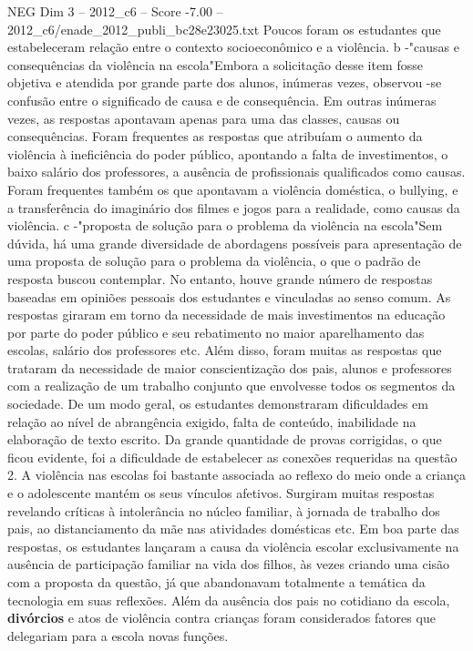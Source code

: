 \begin{textsample}{NEG Dim 3 – 2012\_c6 – Score -7.00 – 2012\_c6/enade\_2012\_publi\_bc28e23025.txt}
Poucos foram os estudantes que estabeleceram relação entre o contexto socioeconômico e a violência. b -"causas e consequências da violência na escola"Embora a solicitação desse item fosse objetiva e atendida por grande parte dos alunos, inúmeras vezes, observou -se confusão entre o significado de causa e de consequência.
Em outras inúmeras vezes, as respostas apontavam apenas para uma das classes, causas ou consequências.
Foram frequentes as respostas que atribuíam o aumento da violência à ineficiência do poder público, apontando a falta de investimentos, o baixo salário dos professores, a ausência de profissionais qualificados como causas.
Foram frequentes também os que apontavam a violência doméstica, o bullying, e a transferência do imaginário dos filmes e jogos para a realidade, como causas da violência. c -"proposta de solução para o problema da violência na escola"Sem dúvida, há uma grande diversidade de abordagens possíveis para apresentação de uma proposta de solução para o problema da violência, o que o padrão de resposta buscou contemplar.
No entanto, houve grande número de respostas baseadas em opiniões pessoais dos estudantes e vinculadas ao senso comum.
As respostas giraram em torno da necessidade de mais investimentos na educação por parte do poder público e seu rebatimento no maior aparelhamento das escolas, salário dos professores etc.
Além disso, foram muitas as respostas que trataram da necessidade de maior conscientização dos pais, alunos e professores com a realização de um trabalho conjunto que envolvesse todos os segmentos da sociedade.
De um modo geral, os estudantes demonstraram dificuldades em relação ao nível de abrangência exigido, falta de conteúdo, inabilidade na elaboração de texto escrito.
Da grande quantidade de provas corrigidas, o que ficou evidente, foi a dificuldade de estabelecer as conexões requeridas na questão 2.
A violência nas escolas foi bastante associada ao reflexo do meio onde a criança e o adolescente mantém os seus vínculos afetivos.
Surgiram muitas respostas revelando críticas à intolerância no núcleo familiar, à jornada de trabalho dos pais, ao distanciamento da mãe nas atividades domésticas etc.
Em boa parte das respostas, os estudantes lançaram a causa da violência escolar exclusivamente na ausência de participação familiar na vida dos filhos, às vezes criando uma cisão com a proposta da questão, já que abandonavam totalmente a temática da tecnologia em suas reflexões.
Além da ausência dos pais no cotidiano da escola, \textbf{divórcios} e atos de violência contra crianças foram considerados fatores que delegariam para a escola novas funções.

\end{textsample}
